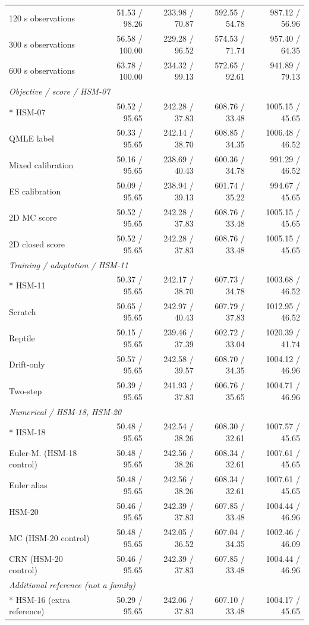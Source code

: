 \begin{longtable}{@{}p{.25\linewidth}rrrr@{}}
120 s observations & 51.53 / 98.26 & 233.98 / 70.87 & 592.55 / 54.78 & 987.12 / 56.96\\
300 s observations & 56.58 / 100.00 & 229.28 / 96.52 & 574.53 / 71.74 & 957.40 / 64.35\\
600 s observations & 63.78 / 100.00 & 234.32 / 99.13 & 572.65 / 92.61 & 941.89 / 79.13\\
\multicolumn{5}{l}{\textit{Objective / score / HSM-07}}\\*
HSM-07 & 50.52 / 95.65 & 242.28 / 37.83 & 608.76 / 33.48 & 1005.15 / 45.65\\
QMLE label & 50.33 / 95.65 & 242.14 / 38.70 & 608.85 / 34.35 & 1006.48 / 46.52\\
Mixed calibration & 50.16 / 95.65 & 238.69 / 40.43 & 600.36 / 34.78 & 991.29 / 46.52\\
ES calibration & 50.09 / 95.65 & 238.94 / 39.13 & 601.74 / 35.22 & 994.67 / 45.65\\
2D MC score & 50.52 / 95.65 & 242.28 / 37.83 & 608.76 / 33.48 & 1005.15 / 45.65\\
2D closed score & 50.52 / 95.65 & 242.28 / 37.83 & 608.76 / 33.48 & 1005.15 / 45.65\\
\multicolumn{5}{l}{\textit{Training / adaptation / HSM-11}}\\*
HSM-11 & 50.37 / 95.65 & 242.17 / 38.70 & 607.73 / 34.78 & 1003.68 / 46.52\\
Scratch & 50.65 / 95.65 & 242.97 / 40.43 & 607.79 / 37.83 & 1012.95 / 46.52\\
Reptile & 50.15 / 95.65 & 239.46 / 37.39 & 602.72 / 33.04 & 1020.39 / 41.74\\
Drift-only & 50.57 / 95.65 & 242.58 / 39.57 & 608.70 / 34.35 & 1004.12 / 46.96\\
Two-step & 50.39 / 95.65 & 241.93 / 37.83 & 606.76 / 35.65 & 1004.71 / 46.96\\
\multicolumn{5}{l}{\textit{Numerical / HSM-18, HSM-20}}\\*
HSM-18 & 50.48 / 95.65 & 242.54 / 38.26 & 608.30 / 32.61 & 1007.57 / 45.65\\
Euler-M. (HSM-18 control) & 50.48 / 95.65 & 242.56 / 38.26 & 608.34 / 32.61 & 1007.61 / 45.65\\
Euler alias & 50.48 / 95.65 & 242.56 / 38.26 & 608.34 / 32.61 & 1007.61 / 45.65\\
HSM-20 & 50.46 / 95.65 & 242.39 / 37.83 & 607.85 / 33.48 & 1004.44 / 46.96\\
MC (HSM-20 control) & 50.48 / 95.65 & 242.05 / 36.52 & 607.04 / 34.35 & 1002.46 / 46.09\\
CRN (HSM-20 control) & 50.46 / 95.65 & 242.39 / 37.83 & 607.85 / 33.48 & 1004.44 / 46.96\\
\multicolumn{5}{l}{\textit{Additional reference (not a family)}}\\*
HSM-16 (extra reference) & 50.29 / 95.65 & 242.06 / 37.83 & 607.10 / 33.48 & 1004.17 / 45.65\\
\end{longtable}
\endgroup

